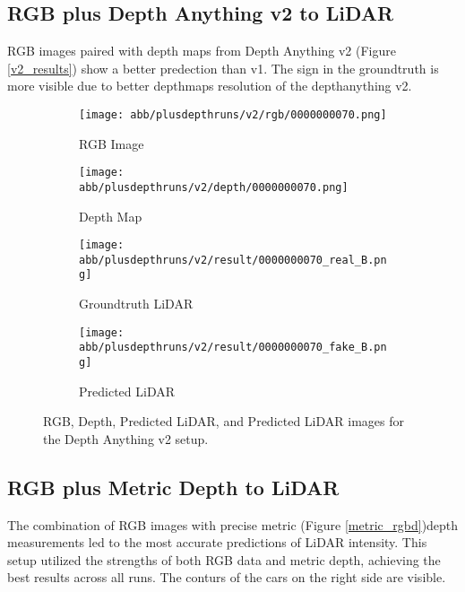 \subsection{RGB plus Depth Anything v2 to LiDAR}
RGB images paired with depth maps from Depth Anything v2 (Figure \ref{v2_results}) show a better predection than v1. The sign in the groundtruth is more visible due to better depthmaps resolution of the depthanything v2.
\begin{figure}[!ht]
	\centering
	\begin{subfigure}{0.4\textwidth}
		\centering
		\texttt{[image: abb/plusdepthruns/v2/rgb/0000000070.png]}
		\caption{RGB Image}
		\label{fig:v2_rgb}
	\end{subfigure}
	
	\vspace{1em} %
	
	\begin{subfigure}{0.4\textwidth}
		\centering
		\texttt{[image: abb/plusdepthruns/v2/depth/0000000070.png]}
		\caption{Depth Map}
		\label{fig:v2_depth}
	\end{subfigure}
	
	\vspace{1em} %
	
	\begin{subfigure}{0.25\textwidth}
		\centering
		\texttt{[image: abb/plusdepthruns/v2/result/0000000070\_real\_B.png]}
		\caption{Groundtruth LiDAR}
		\label{fig:v2_pred_lidar}
	\end{subfigure}
	\begin{subfigure}{0.25\textwidth}
		\centering
		\texttt{[image: abb/plusdepthruns/v2/result/0000000070\_fake\_B.png]}
		\caption{Predicted LiDAR}
		\label{v2}
	\end{subfigure}
	
	\caption{RGB, Depth, Predicted LiDAR, and Predicted LiDAR images for the Depth Anything v2 setup.}
	\label{v2_rgbd}
\end{figure}
\subsection{RGB plus Metric Depth to LiDAR}

The combination of RGB images with precise metric (Figure \ref{metric_rgbd})depth measurements led to the most accurate predictions of LiDAR intensity. This setup utilized the strengths of both RGB data and metric depth, achieving the best results across all runs. The conturs of the cars on the right side are visible. 

